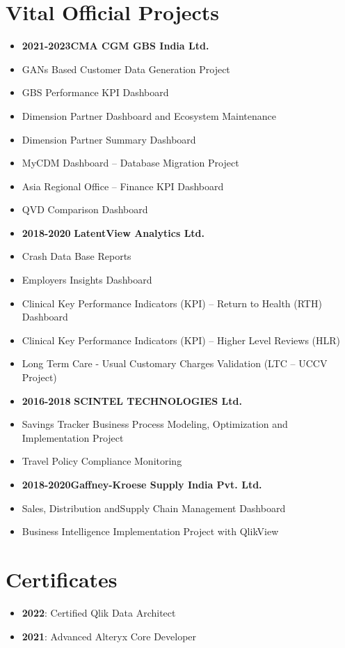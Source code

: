 \documentclass[pastel]{simplehipstercv}
\begin{document}
\begin{paracol}{2}
\section*{Vital Official Projects}
\vspace{1em}
\begin{itemize}
\small \item \textbf {2021-2023}\textbf{CMA CGM GBS India Ltd.}
    \item  GANs Based Customer Data Generation Project
    \item  GBS Performance KPI Dashboard
    \item  Dimension Partner Dashboard and Ecosystem Maintenance
    \item  Dimension Partner Summary Dashboard
    \item  MyCDM Dashboard – Database Migration Project
    \item  Asia Regional Office – Finance KPI Dashboard
    \item  QVD Comparison Dashboard
    \item  \textbf {2018-2020}\textbf{ LatentView Analytics Ltd.}
    \item  Crash Data Base Reports
    \item  Employers Insights Dashboard
    \item  Clinical Key Performance Indicators (KPI) – Return to Health (RTH) Dashboard
    \item  Clinical Key Performance Indicators (KPI) -- Higher Level Reviews (HLR)
    \item  Long Term Care - Usual Customary Charges Validation (LTC – UCCV Project)
\item  \textbf {2016-2018}\textbf{ SCINTEL TECHNOLOGIES Ltd.}
    \item  Savings Tracker Business Process Modeling, Optimization and Implementation Project
    \item  Travel Policy Compliance Monitoring 
\item  \textbf {2018-2020}\textbf{Gaffney-Kroese Supply India Pvt. Ltd.}             \item Sales, Distribution andSupply Chain Management Dashboard
\item Business Intelligence Implementation Project with QlikView
    \end{itemize}
\vspace{1em}
\section*{Certificates}
\begin{itemize}
    \item \textbf{2022}: Certified Qlik Data Architect
    \item \textbf{2021}: Advanced Alteryx Core Developer
\end{itemize}

\end{paracol}
\end{document}
